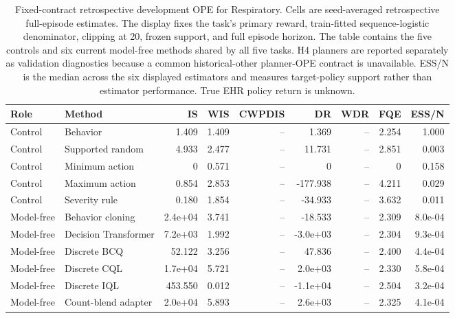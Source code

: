 \begin{table}[p]
\centering
\caption{Fixed-contract retrospective development OPE for Respiratory. Cells are seed-averaged retrospective full-episode estimates. The display fixes the task's primary reward, train-fitted sequence-logistic denominator, clipping at 20, frozen support, and full episode horizon. The table contains the five controls and six current model-free methods shared by all five tasks. H4 planners are reported separately as validation diagnostics because a common historical-other planner-OPE contract is unavailable. ESS/N is the median across the six displayed estimators and measures target-policy support rather than estimator performance. True EHR policy return is unknown.}
\label{tab:ope-estimator-respiratory}
\scriptsize
\setlength{\tabcolsep}{3.6pt}
\begin{tabular}{llrrrrrrr}
\toprule
Role & Method & IS & WIS & CWPDIS & DR & WDR & FQE & ESS/N \\
\midrule
Control & Behavior & 1.409 & 1.409 & -- & 1.369 & -- & 2.254 & 1.000 \\
Control & Supported random & 4.933 & 2.477 & -- & 11.731 & -- & 2.851 & 0.003 \\
Control & Minimum action & 0 & 0.571 & -- & 0 & -- & 0 & 0.158 \\
Control & Maximum action & 0.854 & 2.853 & -- & -177.938 & -- & 4.211 & 0.029 \\
Control & Severity rule & 0.180 & 1.854 & -- & -34.933 & -- & 3.632 & 0.011 \\
\midrule
Model-free & Behavior cloning & 2.4e+04 & 3.741 & -- & -18.533 & -- & 2.309 & 8.0e-04 \\
Model-free & Decision Transformer & 7.2e+03 & 1.992 & -- & -3.0e+03 & -- & 2.304 & 9.3e-04 \\
Model-free & Discrete BCQ & 52.122 & 3.256 & -- & 47.836 & -- & 2.400 & 4.4e-04 \\
Model-free & Discrete CQL & 1.7e+04 & 5.721 & -- & 2.0e+03 & -- & 2.330 & 5.8e-04 \\
Model-free & Discrete IQL & 453.550 & 0.012 & -- & -1.1e+04 & -- & 2.504 & 3.2e-04 \\
Model-free & Count-blend adapter & 2.0e+04 & 5.893 & -- & 2.6e+03 & -- & 2.325 & 4.1e-04 \\
\bottomrule
\end{tabular}
\end{table}

